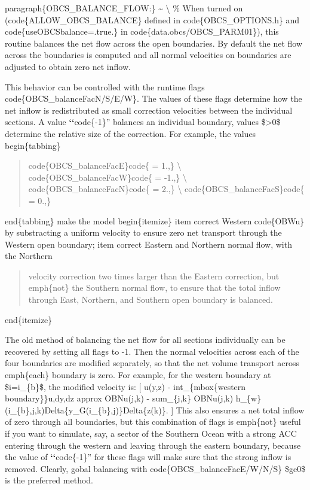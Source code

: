 \documentclass[letterpaper,10pt,english]{sphinxmanual}
\begin{document}
paragraph\{OBCS\_BALANCE\_FLOW:\} \textasciitilde{} \textbackslash{}
\%
When turned on (code\{ALLOW\_OBCS\_BALANCE\}
defined in code\{OBCS\_OPTIONS.h\} and code\{useOBCSbalance=.true.\} in
code\{data.obcs/OBCS\_PARM01\}), this routine balances the net flow
across the open boundaries. By default the net flow across the
boundaries is computed and all normal velocities on boundaries are
adjusted to obtain zero net inflow.

This behavior can be controlled with the runtime flags
code\{OBCS\_balanceFacN/S/E/W\}. The values of these flags determine
how the net inflow is redistributed as small correction velocities
between the individual sections. A value {\color{red}\bfseries{}{}`{}`}code\{-1\}'' balances an
individual boundary, values \$\textgreater{}0\$ determine the relative size of the
correction. For example, the values
begin\{tabbing\}
\begin{quote}

code\{OBCS\_balanceFacE\}code\{ = 1.,\} \textbackslash{}
code\{OBCS\_balanceFacW\}code\{ = -1.,\} \textbackslash{}
code\{OBCS\_balanceFacN\}code\{ = 2.,\} \textbackslash{}
code\{OBCS\_balanceFacS\}code\{ = 0.,\}
\end{quote}

end\{tabbing\}
make the model
begin\{itemize\}
item correct Western code\{OBWu\} by substracting a uniform velocity to
ensure zero net transport through the Western open boundary;
item correct Eastern and Northern normal flow, with the Northern
\begin{quote}

velocity correction two times larger than the Eastern correction, but
emph\{not\} the Southern normal flow, to ensure that the total inflow through
East, Northern, and Southern open boundary is balanced.
\end{quote}

end\{itemize\}

The old method of balancing the net flow for all sections individually
can be recovered by setting all flags to -1. Then the normal
velocities across each of the four boundaries are modified separately,
so that the net volume transport across emph\{each\} boundary is
zero. For example, for the western boundary at \$i=i\_\{b\}\$, the modified
velocity is:
{[}
u(y,z) - int\_\{mbox\{western boundary\}\}u,dy,dz approx OBNu(j,k) - sum\_\{j,k\}
OBNu(j,k) h\_\{w\}(i\_\{b\},j,k)Delta\{y\_G(i\_\{b\},j)\}Delta\{z(k)\}.
{]}
This also ensures a net total inflow of zero through all boundaries,
but this combination of flags is emph\{not\} useful if you want to
simulate, say, a sector of the Southern Ocean with a strong ACC
entering through the western and leaving through the eastern boundary,
because the value of {\color{red}\bfseries{}{}`{}`}code\{-1\}'' for these flags will make sure that
the strong inflow is removed. Clearly, gobal balancing with
code\{OBCS\_balanceFacE/W/N/S\} \$ge0\$ is the preferred method.
\end{document}
